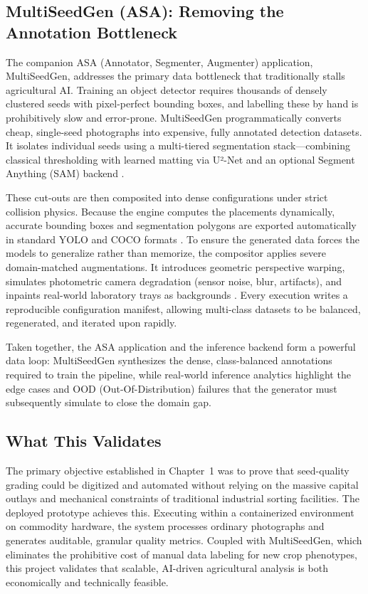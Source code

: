 \subsection{MultiSeedGen (ASA): Removing the Annotation Bottleneck}

The companion ASA (Annotator, Segmenter, Augmenter) application, MultiSeedGen, 
addresses the primary data bottleneck that traditionally stalls agricultural AI. 
Training an object detector requires thousands of densely clustered seeds with 
pixel-perfect bounding boxes, and labelling these by hand is prohibitively slow 
and error-prone. MultiSeedGen programmatically converts cheap, single-seed 
photographs into expensive, fully annotated detection datasets. It isolates 
individual seeds using a multi-tiered segmentation stack—combining classical 
thresholding with learned matting via U²-Net \cite{qin2020u2net} and an optional 
Segment Anything (SAM) backend \cite{kirillov2023sam}. 

These cut-outs are then composited into dense configurations under strict collision 
physics. Because the engine computes the placements dynamically, accurate bounding boxes 
and segmentation polygons are exported automatically in standard YOLO and COCO formats 
\cite{dwibedi2017cutpaste, lin2014coco, yolov8}. To ensure the generated data forces 
the models to generalize rather than memorize, the compositor applies severe 
domain-matched augmentations. It introduces geometric perspective warping, simulates 
photometric camera degradation (sensor noise, blur, artifacts), and inpaints real-world 
laboratory trays as backgrounds \cite{tobin2017domainrand, shorten2019augmentation, buslaev2020albumentations}. 
Every execution writes a reproducible configuration manifest, allowing multi-class 
datasets to be balanced, regenerated, and iterated upon rapidly. 

Taken together, the ASA application and the inference backend form a powerful data loop: 
MultiSeedGen synthesizes the dense, class-balanced annotations required to train the 
pipeline, while real-world inference analytics highlight the edge cases and OOD 
(Out-Of-Distribution) failures that the generator must subsequently simulate to 
close the domain gap.

\subsection{What This Validates}

The primary objective established in Chapter~1 was to prove that seed-quality grading 
could be digitized and automated without relying on the massive capital outlays and 
mechanical constraints of traditional industrial sorting facilities. The deployed 
prototype achieves this. Executing within a containerized environment on commodity 
hardware, the system processes ordinary photographs and generates auditable, granular 
quality metrics. Coupled with MultiSeedGen, which eliminates the prohibitive cost of 
manual data labeling for new crop phenotypes, this project validates that scalable, 
AI-driven agricultural analysis is both economically and technically feasible.


